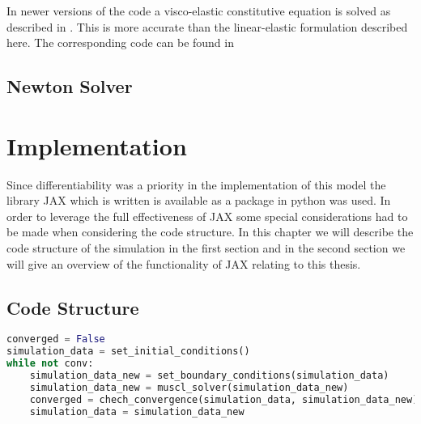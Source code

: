 \documentclass[a4paper, oneside]{discothesis}
\begin{document}
In newer versions of the code a visco-elastic constitutive equation is solved as described in \cite{ALASTRUEY20112250}.
This is more accurate than the linear-elastic formulation described here.
The corresponding code can be found in 

\section{Newton Solver}

\chapter{Implementation}
Since differentiability was a priority in the implementation of this model the library JAX which is written is available as a package in python was used.
In order to leverage the full effectiveness of JAX some special considerations had to be made when considering the code structure.
In this chapter we will describe the code structure of the simulation in the first section and in the second section we will give an overview of the functionality of JAX relating to this thesis.

\section{Code Structure}
\begin{lstlisting}[language=Python, caption=code structure in pseudocode]
converged = False
simulation_data = set_initial_conditions()
while not conv:
	simulation_data_new = set_boundary_conditions(simulation_data)
	simulation_data_new = muscl_solver(simulation_data_new)
	converged = chech_convergence(simulation_data, simulation_data_new)
	simulation_data = simulation_data_new
\end{lstlisting}
\end{document}
